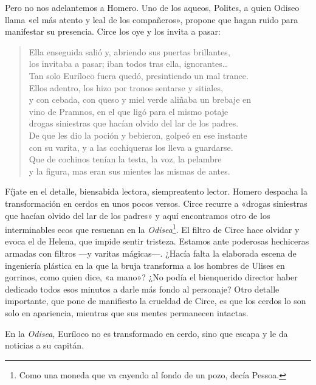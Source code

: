 \documentclass[11pt,a4paper]{article}
\begin{document}
Pero no nos adelantemos a Homero. Uno de los aqueos, Polites, a quien Odiseo llama «el más atento y leal de los compañeros», propone que hagan ruido para manifestar su presencia. Circe los oye y los invita a pasar:

\begin{verse}
Ella enseguida salió y, abriendo sus puertas brillantes,\\
los invitaba a pasar; iban todos tras ella, ignorantes…\\
Tan solo Euríloco fuera quedó, presintiendo un mal trance.\\
Ellos adentro, los hizo por tronos sentarse y sitiales,\\
y con cebada, con queso y miel verde aliñaba un brebaje en\\
vino de Pramnos, en el que ligó para el mismo potaje\\
drogas siniestras que hacían olvido del lar de los padres.\\
De que les dio la poción y bebieron, golpeó en ese instante\\
con su varita, y a las cochiqueras los lleva a guardarse.\\
Que de cochinos tenían la testa, la voz, la pelambre\\
y la figura, mas eran sus mientes las mismas de antes.
\end{verse}

Fíjate en el detalle, biensabida lectora, siempreatento lector. Homero despacha la transformación en cerdos en unos pocos versos. Circe recurre a «drogas siniestras que hacían olvido del lar de los padres» y aquí encontramos otro de los interminables ecos que resuenan en la \emph{Odisea}\footnote{Como una moneda que va cayendo al fondo de un pozo, decía Pessoa.}. El filtro de Circe hace olvidar y evoca el de Helena, que impide sentir tristeza. Estamos ante poderosas hechiceras armadas con filtros ---y varitas mágicas---. ¿Hacía falta la elaborada escena de ingeniería plástica en la que la bruja transforma a los hombres de Ulises en gorrinos, como quien dice, «a mano»? ¿No podía el bienquerido director haber dedicado todos esos minutos a darle más fondo al personaje? Otro detalle importante, que pone de manifiesto la crueldad de Circe, es que los cerdos lo son solo en apariencia, mientras que sus mentes permanecen intactas.

En la \emph{Odisea}, Euríloco no es transformado en cerdo, sino que escapa y le da noticias a su capitán.
\end{document}
